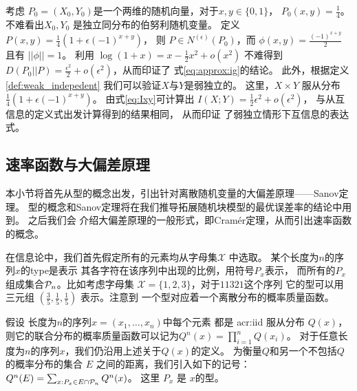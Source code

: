 \begin{example}\label{ex:Pweak_1}
考虑 $P_0=(X_0,Y_0)$是一个两维的随机向量，对于$x,y \in \{0,1\}$，
$P_0(x,y)=\frac{1}{4}$。
不难看出$X_0,Y_0$
是独立同分布的伯努利随机变量。
定义 $P(x,y)=\frac{1}{4}(1+\epsilon (-1)^{x+y})$，
则 $P\in N^{(\epsilon)}(P_0)$，而
$\phi(x,y) = \frac{(-1)^{x+y}}{2}$
且有 $||\phi||=1$。
利用 $\log(1+x) = x - \frac{1}{2}x^2 + o(x^2)$
不难得到 $D(P_0||P)=\frac{\epsilon^2}{2}
+o(\epsilon^2)$，从而印证了
式\eqref{eq:approx:ig}的结论。
此外，根据定义 \ref{def:weak_indepedent} 
我们可以验证$X$与$Y$是弱独立的。
这里，$X\times Y$ 服从分布$\frac{1}{4}(1+\epsilon (-1)^{x+y})$。
由式\eqref{eq:Ixy}可计算出
$I(X;Y)=\frac{1}{2}\epsilon^2+o(\epsilon^2)$，
与从互信息的定义式出发计算得到的结果相同，
从而印证
了弱独立情形下互信息的表达式。
\end{example}

\subsection{速率函数与大偏差原理}
本小节将首先从型的概念出发，引出针对离散随机变量的大偏差原理——Sanov定理。
型的概念和Sanov定理将在我们推导拓展随机块模型的最优误差率的结论中用到。
之后我们会
介绍大偏差原理的一般形式，即Cramér定理，从而引出速率函数的概念。

在信息论中，我们首先假定所有的元素均从字母集$\mathcal{X}$
中选取。
某个长度为$n$的序列$x$的\gls{type}是表示
其各字符在该序列中出现的比例，用符号$P_x$表示，
而所有的$P_x$组成集合$\P_n$。比如考虑字母集
$\mathcal{X}=\{1,2,3\}$，对于$11321$这个序列
它的型可以用三元组 $(\frac{3}{5}, 
\frac{1}{5}, \frac{1}{5})$ 表示。注意到
一个型对应着一个离散分布的概率质量函数。

假设 长度为$n$的序列$x=(x_1,\dots, x_n)$中每个元素 都是 \gls{acr:iid} 
服从分布 $Q(x)$，
则它的联合分布的概率质量函数可以记为$Q^n(x)=\prod_{i=1}^n Q(x_i)$。
对于任意长度为$n$的序列$x$，我们仍沿用上述关于$Q(x)$的定义。
为衡量$Q$和另一个不包括$Q$的概率分布的集合 $E$ 之间的距离，我们引入如下的记号：
$Q^n(E) = \sum_{x: P_x \in E \cap \P_n} Q^n(x)$。
这里 $P_x$ 是 $x$的型。

